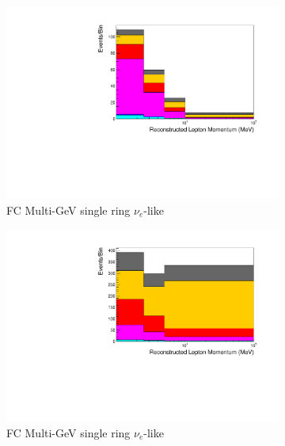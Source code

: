 \begin{figure}[ht]
\begin{subfigure}[t]{0.49\textwidth}
    \includegraphics[width=\textwidth, trim= 0 0 0 30, clip]{Figures/Selections/AtmSpectra_ByMode/MultiGeV-elike-nue_X.pdf}
    \caption{FC Multi-GeV single ring $\nu_e$-like}
    \end{subfigure}%
    \begin{subfigure}[t]{0.49\textwidth}
    \includegraphics[width=\textwidth, trim= 0 0 0 30, clip]{Figures/Selections/AtmSpectra_ByMode/MultiRing-elike-nue_X.pdf}
    \caption{FC Multi-GeV single ring $\nu_e$-like}
    \end{subfigure}
    \begin{subfigure}[t]{0.49\textwidth}

\end{subfigure}
\end{figure}
